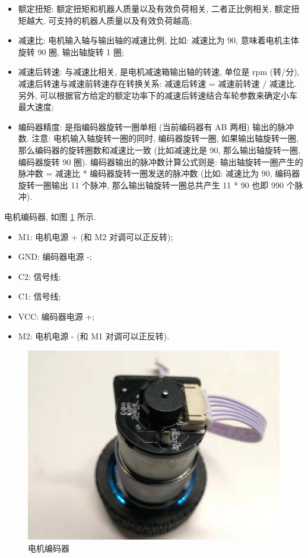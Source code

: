 \documentclass[openany, fontset=windowsold]{ctexbook}
\theoremstyle{kaiti}
\theoremstyle{normal}
\begin{document}
\begin{itemize}
  \item 额定扭矩: 额定扭矩和机器人质量以及有效负荷相关, 二者正比例相关, 额定扭矩越大, 可支持的机器人质量以及有效负荷越高;

  \item 减速比: 电机输入轴与输出轴的减速比例, 比如: 减速比为 90, 意味着电机主体旋转 90 圈, 输出轴旋转 1 圈;

  \item 减速后转速: 与减速比相关, 是电机减速箱输出轴的转速, 单位是 rpm (转/分), 减速后转速与减速前转速存在转换关系: 减速后转速 = 减速前转速 / 减速比. 另外, 可以根据官方给定的额定功率下的减速后转速结合车轮参数来确定小车最大速度;

  \item 编码器精度: 是指编码器旋转一圈单相 (当前编码器有 AB 两相) 输出的脉冲数. 注意: 电机输入轴旋转一圈的同时, 编码器旋转一圈, 如果输出轴旋转一圈, 那么编码器的旋转圈数和减速比一致 (比如减速比是 90, 那么输出轴旋转一圈, 编码器旋转 90 圈). 编码器输出的脉冲数计算公式则是: 输出轴旋转一圈产生的脉冲数 = 减速比 * 编码器旋转一圈发送的脉冲数 (比如: 减速比为 90, 编码器旋转一圈输出 11 个脉冲, 那么输出轴旋转一圈总共产生 11 * 90 也即 990 个脉冲).
\end{itemize}

电机编码器, 如图 \ref{fig:motor_encoder} 所示.

\begin{itemize}
  \item M1: 电机电源 + (和 M2 对调可以正反转);
  \item GND: 编码器电源 -;
  \item C2: 信号线;
  \item C1: 信号线;
  \item VCC: 编码器电源 +;
  \item M2: 电机电源 - (和 M1 对调可以正反转).
\end{itemize}

\begin{figure}[!ht]
  \centering
  \includegraphics[width=.5\textwidth]{motor_encoder.jpg}
  \caption{电机编码器}
  \label{fig:motor_encoder}
\end{figure}
\end{document}
